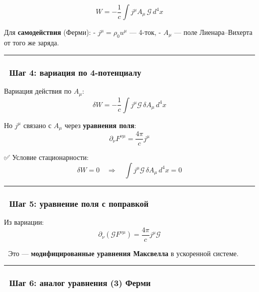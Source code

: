 \documentclass[11pt]{article}
\begin{document}
\[
W = -\frac{1}{c} \int j^\mu A_\mu \, \mathcal{G} \, d^4x
\]

Для \textbf{самодействия} (Ферми): - \(j^\mu = \rho_0 u^\mu\) --- 4-ток,
- \(A_\mu\) --- поле Лиенара--Вихерта от того же заряда.

\begin{center}\rule{0.5\linewidth}{\linethickness}\end{center}

\subsubsection{🔹 Шаг 4: вариация по
4-потенциалу}\label{ux448ux430ux433-4-ux432ux430ux440ux438ux430ux446ux438ux44f-ux43fux43e-4-ux43fux43eux442ux435ux43dux446ux438ux430ux43bux443-1}

Вариация действия по \(A_\mu\): \[
\delta W = -\frac{1}{c} \int j^\mu \mathcal{G} \, \delta A_\mu \, d^4x
\]

Но \(j^\mu\) связано с \(A_\mu\) через \textbf{уравнения поля}: \[
\partial_\nu F^{\nu\mu} = \frac{4\pi}{c} j^\mu
\]

✅ Условие стационарности: \[
\delta W = 0 \quad \Rightarrow \quad \int j^\mu \mathcal{G} \, \delta A_\mu \, d^4x = 0
\]

\begin{center}\rule{0.5\linewidth}{\linethickness}\end{center}

\subsubsection{🔹 Шаг 5: уравнение поля с
поправкой}\label{ux448ux430ux433-5-ux443ux440ux430ux432ux43dux435ux43dux438ux435-ux43fux43eux43bux44f-ux441-ux43fux43eux43fux440ux430ux432ux43aux43eux439-1}

Из вариации: \[
\partial_\nu \left( \mathcal{G} F^{\nu\mu} \right) = \frac{4\pi}{c} j^\mu \mathcal{G}
\]

📌 Это --- \textbf{модифицированные уравнения Максвелла} в ускоренной
системе.

\begin{center}\rule{0.5\linewidth}{\linethickness}\end{center}

\subsubsection{🔹 Шаг 6: аналог уравнения (3)
Ферми}\label{ux448ux430ux433-6-ux430ux43dux430ux43bux43eux433-ux443ux440ux430ux432ux43dux435ux43dux438ux44f-3-ux444ux435ux440ux43cux438}
\end{document}
